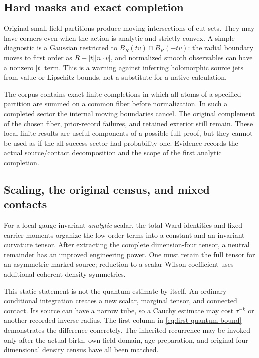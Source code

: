 \subsection{Hard masks and exact completion}

Original small-field partitions produce moving intersections of cut sets. They may have corners even when the action is analytic and strictly convex. A simple diagnostic is a Gaussian restricted to $B_R(tv)\cap B_R(-tv)$: the radial boundary moves to first order as $R-|t||n\cdot v|$, and normalized smooth observables can have a nonzero $|t|$ term. This is a warning against inferring holomorphic source jets from value or Lipschitz bounds, not a substitute for a native calculation.

The corpus contains exact finite completions in which all atoms of a specified partition are summed on a common fiber before normalization. In such a completed sector the internal moving boundaries cancel. The original complement of the chosen fiber, prior-record failures, and retained exterior still remain. These local finite results are useful components of a possible full proof, but they cannot be used as if the all-success sector had probability one. Evidence  records the actual source/contact decomposition and the scope of the first analytic completion.

\subsection{Scaling, the original census, and mixed contacts}

For a local gauge-invariant \emph{analytic} scalar, the total Ward identities and fixed carrier moments organize the low-order terms into a constant and an invariant curvature tensor. After extracting the complete dimension-four tensor, a neutral remainder has an improved engineering power. One must retain the full tensor for an asymmetric marked source; reduction to a scalar Wilson coefficient uses additional coherent density symmetries.

This static statement is not the quantum estimate by itself. An ordinary conditional integration creates a new scalar, marginal tensor, and connected contact. Its source can have a narrow tube, so a Cauchy estimate may cost $\tau^{-k}$ or another recorded inverse radius. The first column in \eqref{eq:first-quantum-bound} demonstrates the difference concretely. The inherited recurrence may be invoked only after the actual birth, own-field domain, age preparation, and original four-dimensional density census have all been matched.

